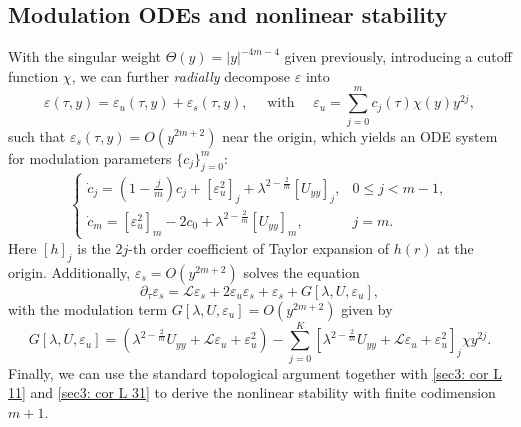 \documentclass[12pt]{caltech_thesis}
\numberwithin{equation}{section}
\begin{document}
\subsection{Modulation ODEs and nonlinear stability} With the singular weight $\Theta(y) = |y|^{-4m-4}$ given previously, introducing a cutoff function $\chi$, we can further \textit{radially} decompose $\varepsilon$ into
\begin{equation}
\varepsilon(\tau,y)= \varepsilon_u(\tau,y) + \varepsilon_s(\tau,y), \quad \text{ with }  \quad \varepsilon_u = \sum_{j=0}^{m} c_j(\tau) \chi(y) y^{2j},
\end{equation}
such that $\varepsilon_s(\tau,y) = O(y^{2m+2})$ near the origin, which yields an ODE system for modulation parameters $\{ c_j \}_{j=0}^m$:
\begin{equation}
\begin{cases}
    \dot c_j = \left( 1- \frac{j}{m} \right) c_j + [\varepsilon_u^2]_j + \lambda^{2- \frac{2}{m}} [U_{yy}]_j, & 0 \leq j < m-1,
    \\
    \dot c_{m} = [\varepsilon_u^2]_m - 2c_0 + \lambda^{2- \frac{2}{m}}[U_{yy}]_m, & j=m.
\end{cases}
\end{equation}
Here $[h]_j$ is the $2j$-th order coefficient of Taylor expansion of $h(r)$ at the origin.
Additionally, $\varepsilon_s = O(y^{2m+2})$ solves the equation
\[
\partial_\tau \varepsilon_s =  \mathcal{L} \varepsilon_s  + 2 \varepsilon_u \varepsilon_s + \varepsilon_s + G[\lambda,U,\varepsilon_u],
\]
with the modulation term $G[\lambda,U,\varepsilon_u]= O(y^{2m+2})$ given by 
\[
G[\lambda,U,\varepsilon_u]= \left( \lambda^{2-\frac{2}{m}} U_{yy} + \mathcal{L}\varepsilon_u + \varepsilon_u^2 \right) - \sum_{j=0}^K \left[\lambda^{2-\frac{2}{m}} U_{yy} + \mathcal{L} \varepsilon_u + \varepsilon_u^2 \right]_j \chi  y^{2j}.
\]
Finally, we can use the standard topological argument together with \eqref{sec3: cor L 11} and \eqref{sec3: cor L 31} to derive the nonlinear stability with finite codimension $m+1$. 
\end{document}
